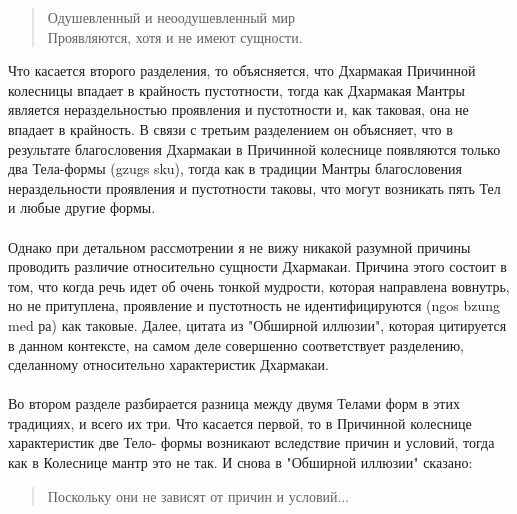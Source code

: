 \begin{verse}
Одушевленный и неоодушевленный мир\\
Проявляются, хотя и не имеют сущности.
\end{verse}

Что касается второго разделения, то объясняется, что Дхармакая Причинной
колесницы впадает в крайность пустотности, тогда как Дхармакая Мантры является
нераздельностью проявления и пустотности и, как таковая, она не впадает в крайность. В
связи с третьим разделением он объясняет, что в результате благословения Дхармакаи в
Причинной колеснице появляются только два Тела-формы (gzugs sku), тогда как в традиции
Мантры благословения нераздельности проявления и пустотности таковы, что могут
возникать пять Тел и любые другие формы.\\
\\
Однако при детальном рассмотрении я не вижу никакой разумной причины проводить
различие относительно сущности Дхармакаи. Причина этого состоит в том, что когда речь
идет об очень тонкой мудрости, которая направлена вовнутрь, но не притуплена, проявление
и пустотность не идентифицируются (ngos bzung med ра) как таковые. Далее, цитата из
"Обширной иллюзии", которая цитируется в данном контексте, на самом деле совершенно
соответствует разделению, сделанному относительно характеристик Дхармакаи.\\
\\
Во втором разделе разбирается разница между двумя Телами форм в этих традициях,
и всего их три. Что касается первой, то в Причинной колеснице характеристик две Тело-
формы возникают вследствие причин и условий, тогда как в Колеснице мантр это не так. И
снова в "Обширной иллюзии" сказано:

\begin{verse}
Поскольку они не зависят от причин и условий...
\end{verse}

